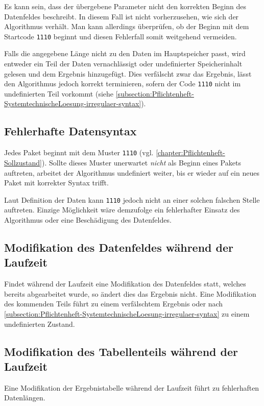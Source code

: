 Es kann sein, dass der übergebene Parameter nicht den korrekten Beginn des Datenfeldes beschreibt. In diesem Fall ist nicht vorherzusehen, wie sich der Algorithmus verhält. Man kann allerdings überprüfen, ob der Beginn mit dem Startcode \texttt{1110} beginnt und diesen Fehlerfall somit weitgehend vermeiden.

Falls die angegebene Länge nicht zu den Daten im Hauptspeicher passt, wird entweder ein Teil der Daten vernachlässigt oder undefinierter Speicherinhalt gelesen und dem Ergebnis hinzugefügt. Dies verfälscht zwar das Ergebnis, lässt den Algorithmus jedoch korrekt terminieren, sofern der Code \texttt{1110} nicht im undefinierten Teil vorkommt (siehe \autoref{subsection:Pflichtenheft-SystemtechnischeLoesung-irregulaer-syntax}).

\subsection{Fehlerhafte Datensyntax}
\label{subsection:Pflichtenheft-SystemtechnischeLoesung-irregulaer-syntax}

Jedes Paket beginnt mit dem Muster \texttt{1110} (vgl. \autoref{chapter:Pflichtenheft-Sollzustand}). Sollte dieses Muster unerwartet \emph{nicht} als Beginn eines Pakets auftreten, arbeitet der Algorithmus undefiniert weiter, bis er wieder auf ein neues Paket mit korrekter Syntax trifft.

Laut Definition der Daten kann \texttt{1110} jedoch nicht an einer solchen falschen Stelle auftreten. Einzige Möglichkeit wäre demzufolge ein fehlerhafter Einsatz des Algorithmus oder eine Beschädigung des Datenfeldes.

\subsection{Modifikation des Datenfeldes während der Laufzeit}
\label{subsection:Pflichtenheft-SystemtechnischeLoesung-irregulaer-moddatenfeld}

Findet während der Laufzeit eine Modifikation des Datenfeldes statt, welches bereits abgearbeitet wurde, so ändert dies das Ergebnis nicht. Eine Modifikation des kommenden Teils führt zu einem verfälschtem Ergebnis oder nach \autoref{subsection:Pflichtenheft-SystemtechnischeLoesung-irregulaer-syntax} zu einem undefinierten Zustand.

\subsection{Modifikation des Tabellenteils während der Laufzeit}
\label{subsection:Pflichtenheft-SystemtechnischeLoesung-irregulaer-modtabelle}

Eine Modifikation der Ergebnistabelle während der Laufzeit führt zu fehlerhaften Datenlängen. 
